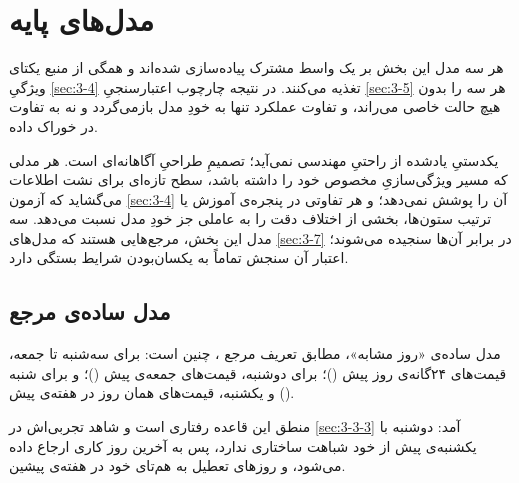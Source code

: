 
\section{مدل‌های پایه}
\label{sec:3-6}

هر سه مدل این بخش بر یک واسط مشترک پیاده‌سازی شده‌اند و همگی از منبع یکتای ویژگیِ
\cref{sec:3-4} تغذیه می‌کنند. در نتیجه چارچوب اعتبارسنجیِ \cref{sec:3-5} هر سه را بدون هیچ حالت
خاصی می‌راند، و تفاوت عملکرد تنها به خودِ مدل بازمی‌گردد و نه به تفاوت در خوراک داده.

یکدستیِ یادشده از راحتیِ مهندسی نمی‌آید؛ تصمیمِ طراحیِ آگاهانه‌ای است. هر مدلی که مسیر
ویژگی‌سازیِ مخصوص خود را داشته باشد، سطح تازه‌ای برای نشت اطلاعات می‌گشاید که آزمون
\cref{sec:3-4} آن را پوشش نمی‌دهد؛ و هر تفاوتی در پنجره‌ی آموزش یا ترتیب ستون‌ها، بخشی از
اختلاف دقت را به عاملی جز خودِ مدل نسبت می‌دهد. سه مدل این بخش، مرجع‌هایی هستند که
مدل‌های \cref{sec:3-7} در برابر آن‌ها سنجیده می‌شوند؛ اعتبار آن سنجش تماماً به یکسان‌بودن
شرایط بستگی دارد.

\subsection*{مدل ساده‌ی مرجع}

مدل ساده‌ی «روز مشابه»، مطابق تعریف مرجع \cite{lago_forecasting_2021}، چنین است: برای
سه‌شنبه تا جمعه، قیمت‌های ۲۴گانه‌ی روز پیش ()؛ برای دوشنبه، قیمت‌های جمعه‌ی پیش
()؛ و برای شنبه و یکشنبه، قیمت‌های همان روز در هفته‌ی پیش ().

منطق این قاعده رفتاری است و شاهد تجربی‌اش در \cref{sec:3-3-3} آمد: دوشنبه با یکشنبه‌ی پیش از
خود شباهت ساختاری ندارد، پس به آخرین روز کاری ارجاع داده می‌شود، و روزهای تعطیل به
هم‌تای خود در هفته‌ی پیشین.

